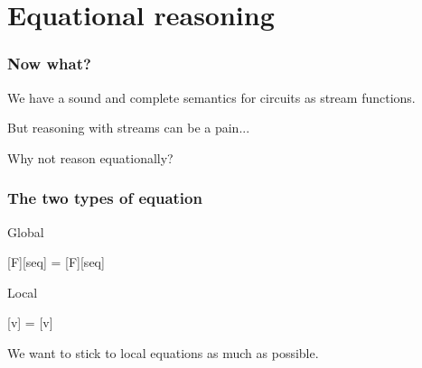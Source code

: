 \section{Equational reasoning}

\begin{frame}
    \frametitle{Now what?}

    We have a \alert{sound and complete} semantics for circuits as
    \alert{stream functions}.

    \pause

    But reasoning with streams can be a \alert{pain}...

    \pause
    Why not reason \alert{equationally}?
\end{frame}
\begin{frame}
    \frametitle{The two types of equation}

    \centering
    \begin{minipage}{0.49\textwidth}
        \centering
        \alert{Global}

        \vspace{1.5em}

        [F][seq]
        =
        [F][seq]
    \end{minipage}
    \begin{minipage}{0.49\textwidth}
        \centering
        \alert{Local}

        \vspace{1.5em}

        [v]
        =
        [v]
    \end{minipage}

    \vspace{1.5em}

    We want to stick to local equations \alert{as much as possible}.

\end{frame}

